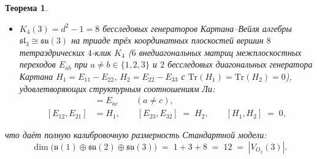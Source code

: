 \documentclass[11pt,a4paper]{article}
\theoremstyle{plain}
\newtheorem{theorem}{Теорема}[section]
\theoremstyle{definition}
\begin{document}
\begin{theorem}
\begin{enumerate}[label=\textbf{(\arabic*)},leftmargin=*]
\begin{itemize}[leftmargin=*]
\begin{equation}
    \end{equation}
    образующих замкнутую алгебру Ли $\mathfrak{so}(3) \cong \mathfrak{su}(2)$ со структурными константами:
    \begin{equation}
      \label{eq:su2-commutators}
      [L_1, L_2] \;=\; L_3, \qquad
      [L_2, L_3] \;=\; L_1, \qquad
      [L_3, L_1] \;=\; L_2;
    \end{equation}
  \item $K_4(3) = d^2 - 1 = 8$ бесследовых генераторов Картана--Вейля алгебры $\mathfrak{sl}_3 \cong \mathfrak{su}(3)$ на триаде трёх координатных плоскостей вершин $8$ тетраэдрических $4$-клик $K_4$ ($6$ внедиагональных матриц межплоскостных переходов $E_{ab}$ при $a \ne b \in \{1,2,3\}$ и $2$ бесследовых диагональных генератора Картана $H_1 = E_{11} - E_{22}$, $H_2 = E_{22} - E_{33}$ с $\mathrm{Tr}(H_1) = \mathrm{Tr}(H_2) = 0$), удовлетворяющих структурным соотношениям Ли:
    \begin{align}
      [E_{ab}, E_{bc}] &= E_{ac} \qquad (a \ne c), \label{eq:su3-comm-step} \\
      [E_{12}, E_{21}] &= H_1, \qquad [E_{23}, E_{32}] \;=\; H_2, \qquad [H_1, H_2] \;=\; 0, \label{eq:su3-comm-cartan}
    \end{align}
  \end{itemize}
  что даёт полную калибровочную размерность Стандартной модели:
  \begin{equation}
    \label{eq:sm-gauge-dim-12}
    \dim\bigl(\mathfrak{u}(1)\oplus\mathfrak{su}(2)\oplus\mathfrak{su}(3)\bigr) \;=\; 1 + 3 + 8 \;=\; 12 \;=\; |V_{O_2}(3)|.
  \end{equation}


\end{enumerate}
\end{theorem}
\end{document}
